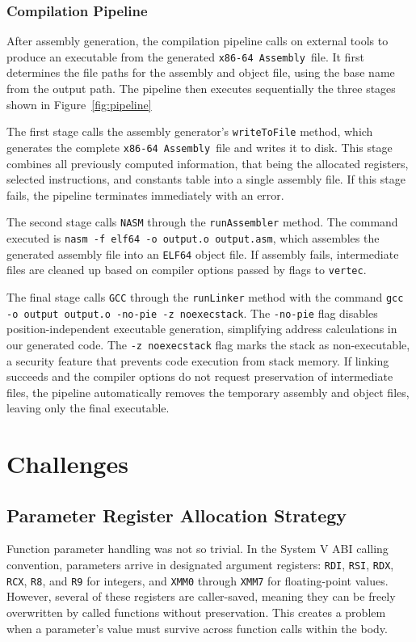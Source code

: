 \documentclass[11pt]{article}
\newcommand{\code}[1]{\texttt{#1}}
\newcommand{\constant}[1]{\texttt{#1}}
\newcommand{\vertec}{\texttt{vertec}}
\newcommand{\asm}{\texttt{x86-64 Assembly}}
\newcommand{\figref}[1]{Figure~\ref{#1}}
\begin{document}
\subsubsection{Compilation Pipeline}

After assembly generation, the compilation pipeline calls on external tools to produce an executable from the generated \asm\ file. It first determines the file paths for the assembly and object file, using the base name from the output path. The pipeline then executes sequentially the three stages shown in \figref{fig:pipeline}

The first stage calls the assembly generator's \code{writeToFile} method, which generates the complete \asm\ file and writes it to disk. This stage combines all previously computed information, that being the allocated registers, selected instructions, and constants table into a single assembly file. If this stage fails, the pipeline terminates immediately with an error.

The second stage calls \constant{NASM} through the \code{runAssembler} method. The command executed is \code{nasm -f elf64 -o output.o output.asm}, which assembles the generated assembly file into an \constant{ELF64} object file. If assembly fails, intermediate files are cleaned up based on compiler options passed by flags to \vertec.

The final stage calls \constant{GCC} through the \code{runLinker} method with the command \code{gcc -o output output.o -no-pie -z noexecstack}. The \code{-no-pie} flag disables position-independent executable generation, simplifying address calculations in our generated code. The \code{-z noexecstack} flag marks the stack as non-executable, a security feature that prevents code execution from stack memory. If linking succeeds and the compiler options do not request preservation of intermediate files, the pipeline automatically removes the temporary assembly and object files, leaving only the final executable.

\section{Challenges}

\subsection{Parameter Register Allocation Strategy}

Function parameter handling was not so trivial. In the System V ABI calling convention, parameters arrive in designated argument registers: \code{RDI}, \code{RSI}, \code{RDX}, \code{RCX}, \code{R8}, and \code{R9} for integers, and \code{XMM0} through \code{XMM7} for floating-point values. However, several of these registers are caller-saved, meaning they can be freely overwritten by called functions without preservation. This creates a problem when a parameter's value must survive across function calls within the body.
\end{document}
